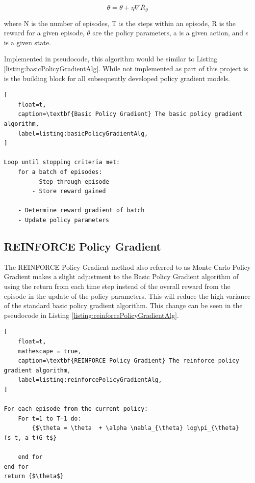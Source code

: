 \documentclass[conference]{IEEEtran}
\begin{document}
$$\theta = \theta  + \eta \nabla \bar{R}_{\theta}$$

where N is the number of episodes, T is the steps within an episode, R is the reward for a given episode, $\theta$ are the policy parameters, a is a given action, and s is a given state.

Implemented in pseudocode, this algorithm would be similar to Listing \ref{listing:basicPolicyGradientAlg}.
While not implemented as part of this project is is the building block for all subsequently developed policy gradient models.

\begin{lstlisting}[
    float=t,
    caption=\textbf{Basic Policy Gradient} The basic policy gradient algorithm,
    label=listing:basicPolicyGradientAlg,
]

Loop until stopping criteria met:
    for a batch of episodes:
        - Step through episode
        - Store reward gained

    - Determine reward gradient of batch
    - Update policy parameters
\end{lstlisting}

\subsection{REINFORCE Policy Gradient}
The REINFORCE Policy Gradient method also referred to as Monte-Carlo Policy Gradient makes a slight adjustment to the Basic Policy Gradient algorithm of using the return from each time step instead of the overall reward from the episode in the update of the policy parameters. This will reduce the high variance of the standard basic policy gradient algorithm.
This change can be seen in the pseudocode in Listing \ref{listing:reinforcePolicyGradientAlg}. 

\begin{lstlisting}[
    float=t,
    mathescape = true,
    caption=\textbf{REINFORCE Policy Gradient} The reinforce policy gradient algorithm,
    label=listing:reinforcePolicyGradientAlg,
]

For each episode from the current policy:
    For t=1 to T-1 do:
        {$\theta = \theta  + \alpha \nabla_{\theta} log\pi_{\theta}(s_t, a_t)G_t$}

    end for
end for
return {$\theta$}
\end{lstlisting}
\end{document}
